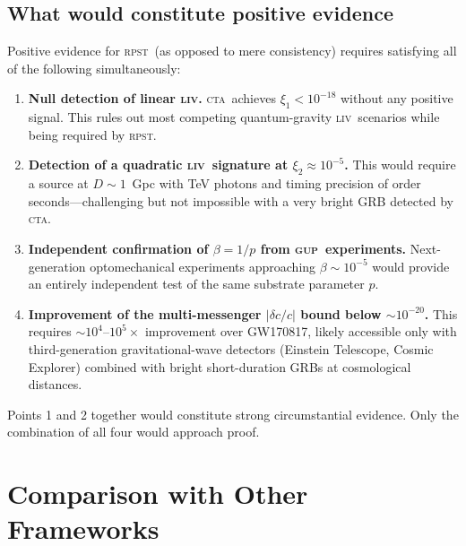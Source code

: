 \documentclass[aps,prd,twocolumn,showpacs,preprintnumbers]{revtex4-2}
\newcommand{\rpst}{\textsc{rpst}}
\newcommand{\CTA}{\textsc{cta}}
\newcommand{\GUP}{\textsc{gup}}
\newcommand{\LIV}{\textsc{liv}}
\newcommand{\abs}[1]{\left|#1\right|}
\begin{document}
\subsection{What would constitute positive evidence}

Positive evidence for \rpst\ (as opposed to mere consistency) requires
satisfying all of the following simultaneously:

\begin{enumerate}

\item \textbf{Null detection of linear \LIV.}  \CTA\ achieves $\xi_1 < 10^{-18}$
  without any positive signal.  This rules out most competing quantum-gravity
  \LIV\ scenarios while being required by \rpst.

\item \textbf{Detection of a quadratic \LIV\ signature at $\xi_2 \approx
  10^{-5}$.}  This would require a source at $D \sim 1$~Gpc with TeV photons
  and timing precision of order seconds---challenging but not impossible with a
  very bright GRB detected by \CTA.

\item \textbf{Independent confirmation of $\beta = 1/p$ from \GUP\
  experiments.}  Next-generation optomechanical experiments approaching
  $\beta \sim 10^{-5}$ would provide an entirely independent test of the same
  substrate parameter $p$.

\item \textbf{Improvement of the multi-messenger $\abs{\delta c/c}$ bound
  below $\sim 10^{-20}$.}  This requires $\sim 10^4$--$10^5\times$ improvement
  over GW170817, likely accessible only with third-generation gravitational-wave
  detectors (Einstein Telescope, Cosmic Explorer) combined with bright
  short-duration GRBs at cosmological distances.

\end{enumerate}

Points 1 and 2 together would constitute strong circumstantial evidence.
Only the combination of all four would approach proof.

\section{Comparison with Other Frameworks}
\label{sec:comparison}
\end{document}
